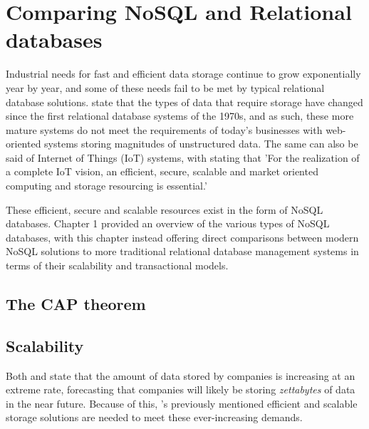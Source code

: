 \chapter{Comparing NoSQL and Relational databases} 



Industrial needs for fast and efficient data storage continue to grow exponentially year by year, and some of these needs fail to be met 
by typical relational database solutions. \textcite{corbelliniPersistingBigdataNoSQL2017} state that the types of data that require storage 
have changed since the first relational database systems of the 1970s, and as such, these more mature systems do not meet the requirements of
today's businesses with web-oriented systems storing magnitudes of unstructured data. The same can also be said of Internet of Things 
(IoT) systems, with  \textcite{gubbiInternetThingsIoT2013} stating that 'For the realization of a complete IoT vision, an efficient, secure,
scalable and market oriented computing and storage resourcing is essential.'

\para These efficient, secure and scalable resources exist in the form of NoSQL databases. Chapter 1 provided an overview of the various 
types of NoSQL databases, with this chapter instead offering direct comparisons between modern NoSQL solutions to more traditional relational 
database management systems in terms of their scalability and transactional models.

\section{The CAP theorem}

\section{Scalability}
Both \textcite{ganiSurveyIndexingTechniques2016} and \textcite{katalBigDataIssues2013} state that the amount of data stored by companies 
is increasing at an extreme rate, forecasting that companies will likely be storing \textit{zettabytes} of data in the near future.
Because of this, \textcite{gubbiInternetThingsIoT2013}'s previously mentioned efficient and scalable storage solutions are needed to meet 
these ever-increasing demands.

